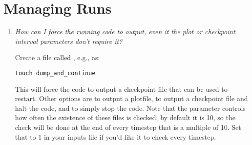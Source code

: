\section{Managing Runs}

\begin{enumerate}

\item {\em How can I force the running code to output, even it the plot or
 checkpoint interval parameters don't require it?}

Create a file called , e.g., as:
\begin{verbatim}
touch dump_and_continue
\end{verbatim}

This will force the code to output a checkpoint file that can be used
to restart.  Other options are  to output
a plotfile,  to output a checkpoint file
and halt the code, and  to simply stop the code.
Note that the parameter  controls how often
the existence of these files is checked; by default it is 10, so the
check will be done at the end of every timestep that is a multiple of 10.
Set that to 1 in your inputs file if you'd like it to check every timestep.




\end{enumerate}
